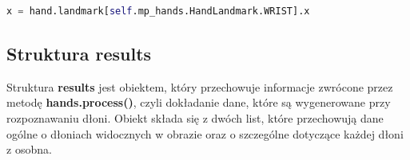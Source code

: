 \begin{lstlisting}[language=python, style=programming, caption={Przykładowe wykorzystanie \textbf{mp\_hands}},captionpos=b, label={lst:enum}]
    x = hand.landmark[self.mp_hands.HandLandmark.WRIST].x
\end{lstlisting}


\subsection{Struktura results}

\quad Struktura \textbf{results} jest obiektem, który przechowuje informacje zwrócone przez metodę \textbf{hands.process()}, czyli dokładanie dane, które są wygenerowane przy rozpoznawaniu dłoni. Obiekt składa się z dwóch list, które przechowują dane ogólne o dłoniach widocznych w obrazie oraz o szczególne dotyczące każdej dłoni z osobna. 

